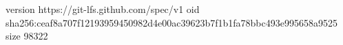 version https://git-lfs.github.com/spec/v1
oid sha256:ceaf8a707f12193959450982d4e00ac39623b7f1b1fa78bbc493e995658a9525
size 98322
